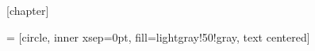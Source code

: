 [chapter]
\renewcommand{\lstlistoflistings}{\listof{mylisting}{List of Listings}}
\providecommand*\theHmylisting{\themylisting}
\let\Chapter\chapter
\def\chapter{\addtocontents{lol}{\protect\addvspace{10pt}}\Chapter}

\renewcommand{\lstlistlistingname}{List of Listings}
\newcommand{\eg}{\mbox{e.g.}\xspace}
\newcommand{\Eg}{\mbox{E.g.}\xspace}
\newcommand{\Ie}{\mbox{I.e.}\xspace}
\newcommand{\ie}{\mbox{i.e.}\xspace}
\newcommand{\Th}{\textsuperscript{th}\xspace}

\renewcommand{\mkcitation}[1]{\par\hfill#1}
\renewcommand{\mkblockquote}[4]{``#1''#2#4#3}

\makeatletter
\renewcommand{\@makechapterhead}[1]{%
\vspace*{0 pt}%
{\setlength{\parindent}{0pt} \raggedright \normalfont
\bfseries\LARGE
\ifnum \value{secnumdepth}>1 
   \if@mainmatter\thechapter\hskip 15\p@\fi%
\fi
#1\par\nobreak\vspace{15 pt}}}
\makeatother

\makeatletter
\renewcommand{\@chapapp}{}
\newenvironment{chapquote}[2][2em]
  {\setlength{\@tempdima}{#1}%
   \def\chapquote@author{#2}%
   \parshape 1 \@tempdima \dimexpr\textwidth-2\@tempdima\relax%
   \itshape}
  {\par\normalfont\hfill--\ \chapquote@author\hspace*{\@tempdima}\par\bigskip}
\makeatother



\newcommand{\figscale}{0.65}
\frenchspacing
\linespread{1.05}

\setlength{\ULdepth}{0.4ex}

 = [circle, inner xsep=0pt, fill=lightgray!50!gray, text centered]

\newcommand{\cc}[1]{{\fontsize{10}{11}\selectfont \texttt{#1}}}
\newcommand{\ccb}[1]{{\fontsize{10}{11}\selectfont \texttt{\textbf{#1}}}}

\setlength{\parindent}{0pt}
\setlength{\parskip}{1ex plus 0.5ex minus 0.2ex}